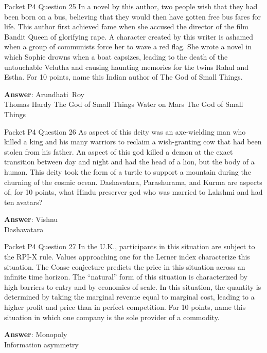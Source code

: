 \begin{frame}{Packet P4 Question 25}
In a novel by this author, two people wish that they had been born on a bus, believing that they would then have gotten free bus fares for life. This author first achieved fame when she accused the director of the film Bandit Queen of glorifying rape. A character created by this writer is ashamed when a group of communists force her to wave a red flag. She wrote a novel in which Sophie drowns when a   boat capsizes, leading to the death of the untouchable Velutha and causing haunting memories for the   twins Rahul and Estha. For 10 points, name this Indian author of The God of Small Things.        

\textbf{Answer}: Arundhati\ Roy\\
 Thomas Hardy
 The God of Small Things
 Water on Mars
 The God of Small Things
\end{frame}

\begin{frame}{Packet P4 Question 26}
As aspect of this deity was an axe-wielding   man who killed a king and his many warriors to reclaim a wish-granting cow that had been stolen from his father. An aspect of this god killed a demon at the exact transition between day and night and had the head of a lion, but the body of a human. This deity took the form of a turtle to support a mountain during the churning of the cosmic ocean. Dashavatara,   Parashurama, and Kurma are aspects of,   for 10 points, what Hindu preserver god     who was married to Lakshmi and had ten avatars?

\textbf{Answer}: Vishnu\\
 Dashavatara
\end{frame}

\begin{frame}{Packet P4 Question 27}
In the U.K., participants in this situation are subject to the RPI-X rule. Values approaching one for   the Lerner index characterize     this situation. The Coase conjecture predicts the price in this situation across an infinite time horizon. The ``natural'' form of this situation is characterized by high barriers   to entry and by economies of scale. In this situation, the quantity is determined by taking the marginal revenue equal to marginal cost, leading to a higher profit and price   than in perfect competition. For 10 points, name this situation in which one company is the sole provider of a commodity.

\textbf{Answer}: Monopoly\\
 Information asymmetry
\end{frame}

